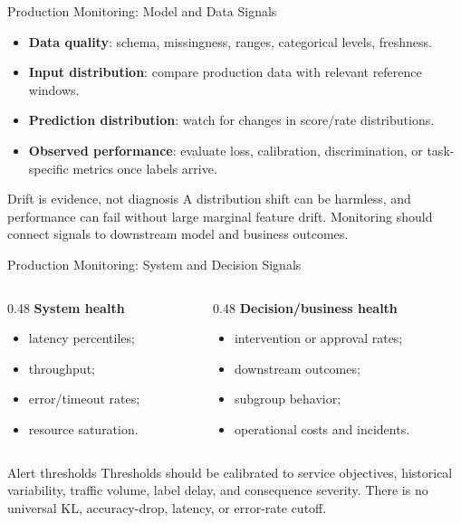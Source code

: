 \begin{frame}{Production Monitoring: Model and Data Signals}
\begin{itemize}
  \item \textbf{Data quality}: schema, missingness, ranges, categorical levels, freshness.
  \item \textbf{Input distribution}: compare production data with relevant reference windows.
  \item \textbf{Prediction distribution}: watch for changes in score/rate distributions.
  \item \textbf{Observed performance}: evaluate loss, calibration, discrimination, or task-specific metrics once labels arrive.
\end{itemize}

\begin{alertblock}{Drift is evidence, not diagnosis}
A distribution shift can be harmless, and performance can fail without large marginal feature drift. Monitoring should connect signals to downstream model and business outcomes.
\end{alertblock}
\end{frame}

\begin{frame}{Production Monitoring: System and Decision Signals}
\begin{columns}
\begin{column}{0.48\textwidth}
\textbf{System health}
\begin{itemize}
  \item latency percentiles;
  \item throughput;
  \item error/timeout rates;
  \item resource saturation.
\end{itemize}
\end{column}

\begin{column}{0.48\textwidth}
\textbf{Decision/business health}
\begin{itemize}
  \item intervention or approval rates;
  \item downstream outcomes;
  \item subgroup behavior;
  \item operational costs and incidents.
\end{itemize}
\end{column}
\end{columns}

\begin{block}{Alert thresholds}
Thresholds should be calibrated to service objectives, historical variability, traffic volume, label delay, and consequence severity. There is no universal KL, accuracy-drop, latency, or error-rate cutoff.
\end{block}
\end{frame}

